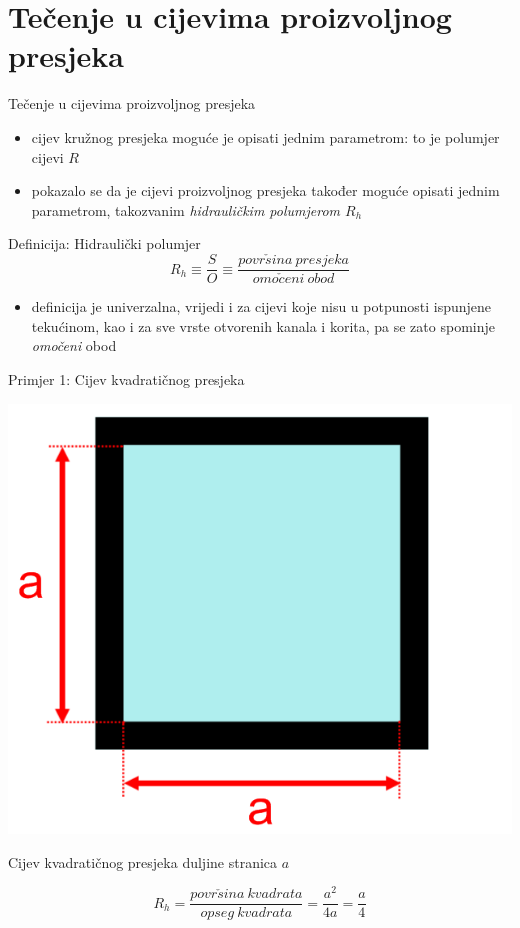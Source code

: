 \documentclass[croatian]{beamer}
\begin{document}
\section{Tečenje u cijevima proizvoljnog presjeka}
\begin{frame}{Tečenje u cijevima proizvoljnog presjeka}

\begin{itemize}
\item cijev kružnog presjeka moguće je opisati jednim parametrom: to je
polumjer cijevi $R$
\item pokazalo se da je cijevi proizvoljnog presjeka također moguće opisati
jednim parametrom, takozvanim \textit{hidrauličkim polumjerom $R_{h}$}
\end{itemize}
\begin{alertblock}{Definicija: Hidraulički polumjer}
\[
R_{h}\equiv\frac{S}{O}\equiv\frac{povr\check{s}ina\:presjeka}{omo\check{c}eni\:obod}
\]
\end{alertblock}
\begin{itemize}
\item definicija je univerzalna, vrijedi i za cijevi koje nisu u potpunosti
ispunjene tekućinom, kao i za sve vrste otvorenih kanala i korita,
pa se zato spominje\emph{ omočeni} obod
\end{itemize}
\end{frame}

\begin{frame}{Primjer 1: Cijev kvadratičnog presjeka}

\begin{center}
\includegraphics[width=0.3\paperwidth]{slike/slika3.PNG}
\par\end{center}
\begin{example}
{Cijev kvadratičnog presjeka duljine stranica $a$}

\[
R_{h}=\frac{povr\check{s}ina\:kvadrata}{opseg\:kvadrata}=\frac{a^{2}}{4a}=\frac{a}{4}
\]

\end{example}

\end{frame}
\end{document}
